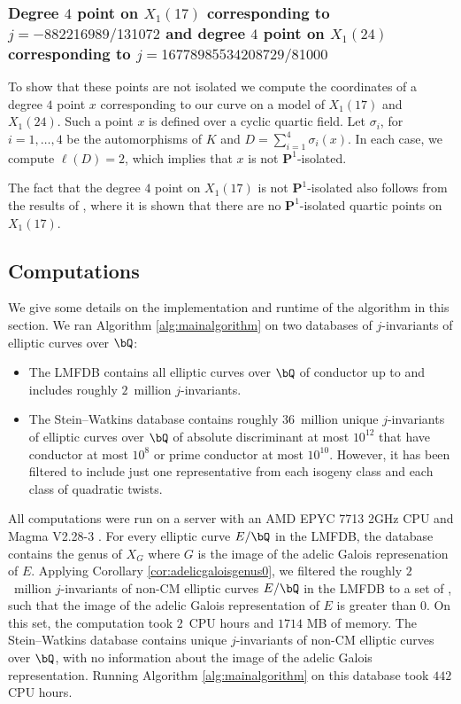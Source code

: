 \documentclass[11pt,reqno]{amsart}
\theoremstyle{plain}
\theoremstyle{definition}
\newcommand{\Q}{\bQ}
\newcommand{\PP}{\mathbf P}
\begin{document}
\subsubsection{Degree $4$ point on $X_1(17)$ corresponding to $j=-882216989/131072$ and degree $4$ point on $X_1(24)$ corresponding to $j=16778985534208729/81000$ }
To show that these points are not isolated we compute the coordinates of a degree $4$ point $x$ corresponding to our curve on a model of $X_1(17)$ and $X_1(24)$. Such a point $x$ is defined over a cyclic quartic field. Let $\sigma_i$, for $i=1,\ldots, 4$ be the automorphisms of $K$ and $D=\sum_{i=1}^4\sigma_i(x)$. In each case, we compute $\ell(D)=2$, which implies that $x$ is not $\PP^1$-isolated.

The fact that the degree $4$ point on $X_1(17)$ is not $\PP^1$-isolated also follows from the results of \cite[Proposition 6.7]{DerickxMazurKamienny}, where it is shown that there are no $\PP^1$-isolated quartic points on $X_1(17)$.

\subsection{Computations}
We give some details on the implementation and runtime of the algorithm in this section.
We ran Algorithm \ref{alg:mainalgorithm}
on two databases of $j$-invariants of elliptic curves over $\Q$:
\begin{itemize}
\item The LMFDB \cite{LMFDB} contains all elliptic curves over $\Q$ of conductor up to  and includes roughly $2$~million $j$-invariants.
\item The Stein--Watkins database \cite{SteinWatkins} contains roughly $36$~million unique $j$-invariants of elliptic curves over $\Q$ of absolute discriminant at most $10^{12}$ that have conductor at most $10^8$ or prime conductor at most $10^{10}$. However, it has been filtered to include just one representative from each isogeny class and each class of quadratic twists.
\end{itemize}
All computations were run on a server with an AMD EPYC 7713 2GHz CPU and Magma V2.28-3 \cite{Magma}.
For every elliptic curve $E/\Q$ in the LMFDB, the database contains the genus of $X_G$ where $G$ is the image of the adelic Galois represenation of $E$. Applying Corollary \ref{cor:adelicgaloisgenus0}, we filtered the roughly $2$~million $j$-invariants of non-CM elliptic curves $E/\Q$ in the LMFDB to a set of , such that the image of the adelic Galois representation of $E$ is greater than $0$. On this set, the computation took $2$~CPU hours and $1714$ MB of memory. The Stein--Watkins database contains  unique $j$-invariants of non-CM elliptic curves over $\Q$, with no information about the image of the adelic Galois representation. Running Algorithm \ref{alg:mainalgorithm} on this database took $442$ CPU hours.
\end{document}
